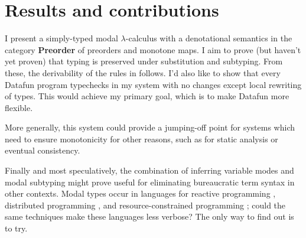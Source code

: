 \documentclass[sigplan,screen,dvipsnames]{acmart}
\newcommand{\catname}[1]{\textbf{#1}}
\newcommand{\Preorder}{\catname{Preorder}}
\newcommand\todo[1]{{\color{Purple}#1}}
\newcommand\fn\lambda
\begin{document}



\section{Results and contributions}

I present a simply-typed modal $\fn$-calculus with a denotational semantics in
the category \Preorder{} of preorders and monotone maps. I aim to prove (but
haven't yet proven) that typing is preserved under substitution and subtyping.
From these, the derivability of the rules in \citet{jrml} follows. I'd also like
to show that every Datafun program \cite{datafun} typechecks in my system with
no changes except local rewriting of types. This would achieve my primary goal, which is to make Datafun more flexible.

More generally, this system could provide a jumping-off point for systems which
need to ensure monotonicity for other reasons, such as for static analysis or
eventual consistency.

Finally and most speculatively, the combination of inferring variable modes and
modal subtyping might prove useful for eliminating bureaucratic term syntax in
other contexts. Modal types occur in languages for reactive programming
\cite{Krishnaswami13:simple-frp}, distributed programming \cite{ml5}, and
resource-constrained programming
\cite{context-constrained,DBLP:conf/esop/GhicaS14}; could the same techniques
make these languages less verbose? The only way to find out is to try.







\end{document}
